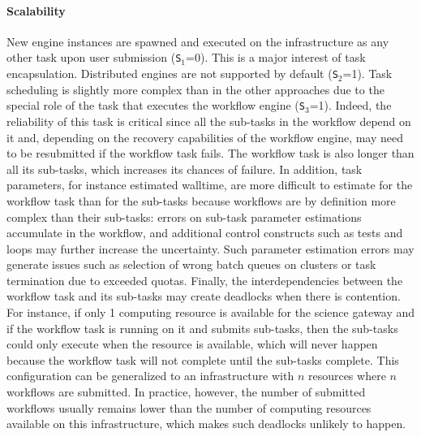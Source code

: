 \documentclass[preprint,3p,twocolumn]{elsarticle}
\newcommand{\todo}[2]{\pdfmargincomment[color=red,author=#1,open=true]{#2}}
\begin{document}

\paragraph{Scalability}
New engine instances are spawned and executed on the infrastructure as
any other task upon user submission (\texttt{S$_1$}=0). This is a
major interest of task encapsulation. Distributed engines are not
supported by default (\texttt{S$_2$}=1). Task scheduling is slightly
more complex than in the other approaches due to the special role of
the task that executes the workflow engine (\texttt{S$_3$}=1). 
Indeed,
the reliability of this task is critical since all the sub-tasks in
the workflow depend on it and, depending on the recovery capabilities
of the workflow engine, may need to be resubmitted if the workflow
task fails. The workflow task is also longer than all its sub-tasks,
which increases its chances of failure. In addition, task parameters,
for instance estimated walltime, are more difficult to estimate for
the workflow task than for the sub-tasks because workflows are by
definition more complex than their sub-tasks: errors on sub-task
parameter estimations accumulate in the workflow, and additional
control constructs such as tests and loops may further increase the
uncertainty. Such parameter estimation errors may generate issues such
as selection of wrong batch queues on clusters or task termination due
to exceeded quotas. Finally, the interdependencies between
the workflow task and its sub-tasks may create deadlocks when there is
contention. For instance, if only 1 computing resource is available
for the science gateway and if the workflow task is running on it and
submits sub-tasks, then the sub-tasks could only execute when the
resource is available, which will never happen because the workflow
task will not complete until the sub-tasks complete. This
configuration can be generalized to an infrastructure with $n$
resources where $n$ workflows are submitted. In practice, however, the
number of submitted workflows usually remains lower than the number of
computing resources available on this infrastructure, which makes such
deadlocks unlikely to happen. 
\end{document}
